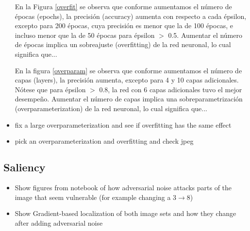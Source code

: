 \begin{itemize}
    En la Figura \ref{overfit} se observa que conforme aumentamos el número de épocas (epochs), la precisión (accuracy) aumenta con respecto a cada épsilon, excepto para 200 épocas, cuya precisión es menor que la de 100 épocas, e incluso menor que la de 50 épocas para épsilon $>$ 0.5. Aumentar el número de épocas implica un sobreajuste (overfitting) de la red neuronal, lo cual significa que...
    
    En la figura \ref{overparam} se observa que conforme aumentamos el número de capas (layers), la precisión aumenta, excepto para 4 y 10 capas adicionales. Nótese que para épsilon $>$ 0.8, la red con 6 capas adicionales tuvo el mejor desempeño. Aumentar el número de capas implica una sobreparametrización (overparameterization) de la red neuronal, lo cual significa que...
    
    \item fix a large overparameterization and see if overfitting has the same effect
    \item pick an overparameterization and overfitting and check jpeg

\end{itemize}
\subsection{Saliency}
\begin{itemize}
    \item Show figures from notebook of how adversarial noise attacks parts of the image that seem vulnerable (for example changing a 3$\to$8)
    \item Show Gradient-based localization of both image sets and how they change after adding adversarial noise\cite{Selvaraju_2019}
\end{itemize}
